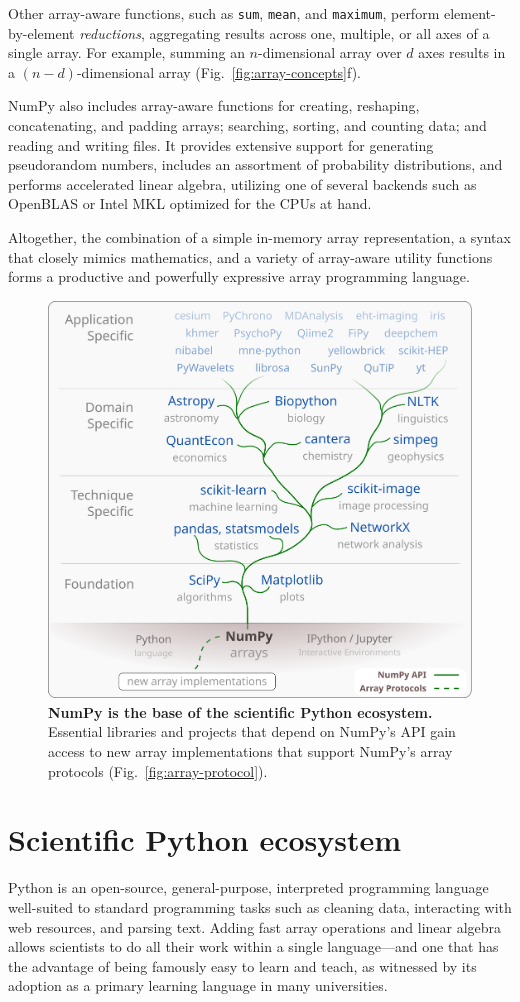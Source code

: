 \documentclass[twocolumn]{article}
\begin{document}
Other array-aware functions, such as \texttt{sum}, \texttt{mean}, and \texttt{maximum}, perform
element-by-element \emph{reductions}, aggregating results across one,
multiple, or all axes of a single array.
For example, summing an $n$-dimensional array over $d$ axes results in a
$(n-d)$-dimensional array (Fig.~\ref{fig:array-concepts}f).

NumPy also includes array-aware functions for creating, reshaping, concatenating, and padding
arrays; searching, sorting, and counting data; and reading and writing files.
It provides extensive support for generating pseudorandom numbers,
includes an assortment of probability distributions, and
performs accelerated linear algebra, utilizing one of several backends
such as OpenBLAS \cite{wang2013augem,xianyi2012model} or Intel MKL optimized
for the CPUs at hand.

Altogether, the combination of a simple in-memory array
representation, a syntax that closely mimics mathematics, and a
variety of array-aware utility functions forms a productive and
powerfully expressive array programming language.

\begin{figure}
  \centering
  \includegraphics[width=.5\textwidth]{ecosystem}
  \caption{\textbf{NumPy is the base of the scientific Python ecosystem.}
   Essential libraries and projects that depend on NumPy's API gain access to new array
   implementations that support NumPy's array protocols (Fig.~\ref{fig:array-protocol}).
  }
  \label{fig:ecosystem}
\end{figure}

\section*{Scientific Python ecosystem}

Python is an open-source, general-purpose, interpreted programming language
well-suited to standard programming tasks such as cleaning data,
interacting with web resources, and parsing text.
Adding fast array operations and linear algebra allows scientists to do all
their work within a single language---and one that has the advantage of
being famously easy to learn and teach, as witnessed by its adoption
as a primary learning language in many universities.
\end{document}
